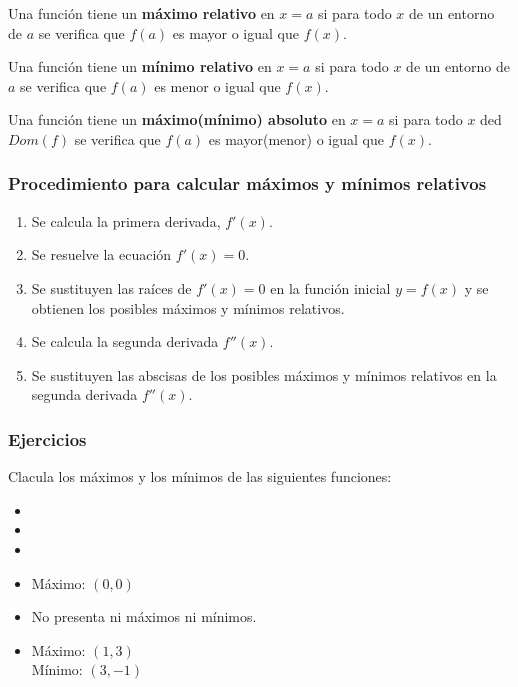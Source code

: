 \begin{definition}
	Una función tiene un \textbf{máximo relativo} en $x=a$ si para todo $x$ de un entorno de $a$ se verifica que $f(a)$ es mayor o igual que $f(x)$.
\end{definition}

\begin{definition}
	Una función tiene un \textbf{mínimo relativo} en $x=a$ si para todo $x$ de un entorno de $a$ se verifica que $f(a)$ es menor o igual que $f(x)$.
\end{definition}

\begin{definition}
	Una función tiene un \textbf{máximo(mínimo) absoluto} en $x=a$ si para todo $x$ ded $Dom (f)$ se verifica que $f(a)$ es mayor(menor) o igual que $f(x)$.
\end{definition}

\subsubsection{Procedimiento para calcular máximos y mínimos relativos}
\begin{enumerate}
	\item Se calcula la primera derivada, $f'(x)$.
	\item Se resuelve la ecuación $f'(x) = 0$.
	\item Se sustituyen las raíces de $f'(x) = 0$ en la función inicial $y = f(x)$ y se obtienen los posibles máximos y mínimos relativos.
	\item Se calcula la segunda derivada $f''(x)$.
	\item Se sustituyen las abscisas de los posibles máximos y mínimos relativos en la segunda derivada $f''(x)$.
\end{enumerate}


\subsubsection{Ejercicios}
\begin{ex}
	Clacula los máximos y los mínimos de las siguientes funciones:\\
	\begin{itemize}
		\item {}
		\item {}
		\item {}
	\end{itemize}
	\begin{sol}
		\begin{itemize}
			\item Máximo: $(0,0)$
			\item No presenta ni máximos ni mínimos.
			\item Máximo: $(1,3)$ \\ Mínimo: $(3,-1)$
		\end{itemize}
	\end{sol}
\end{ex}


